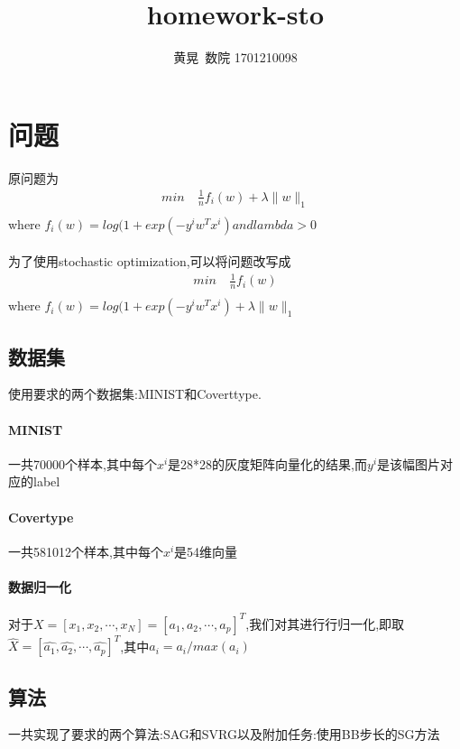 \documentclass[UTF8]{ctexart}
\author{黄晃\ 数院 1701210098 }
\title{homework-sto}
\begin{document}
  \maketitle
  \section{问题}
  原问题为
  \begin{equation}\label{p:1}
    \begin{split}
       min\  &  \frac{1}{n}f_i(w)+\lambda\|w\|_1 \\
    \end{split}
  \end{equation}
  where $f_i(w)=log(1+exp(-y^iw^Tx^i)and lambda>0$
  \paragraph{}
  为了使用stochastic optimization,可以将问题改写成
    \begin{equation}\label{p:2}
    \begin{split}
       min\  &  \frac{1}{n}f_i(w)\\
    \end{split}
  \end{equation}
  where $f_i(w)=log(1+exp(-y^iw^Tx^i)+\lambda\|w\|_1$
  \subsection{数据集}
    使用要求的两个数据集:MINIST和Coverttype.
    \paragraph{MINIST}
    一共70000个样本,其中每个$x^i$是28*28的灰度矩阵向量化的结果,而$y^i$是该幅图片对应的label
    \paragraph{Covertype}
    一共581012个样本,其中每个$x^i$是54维向量
    \paragraph{数据归一化}
    对于$X=[x_1,x_2,\cdots,x_N]=[a_1,a_2,\cdots,a_p]^T$,我们对其进行行归一化,即取$\hat{X}=[\hat{a_1},\hat{a_2},\cdots,\hat{a_p}]^T$,其中$\hat{a_i}=a_i/max(a_i)$
    \subsection{算法}
  一共实现了要求的两个算法:SAG和SVRG以及附加任务:使用BB步长的SG方法
\end{document}
